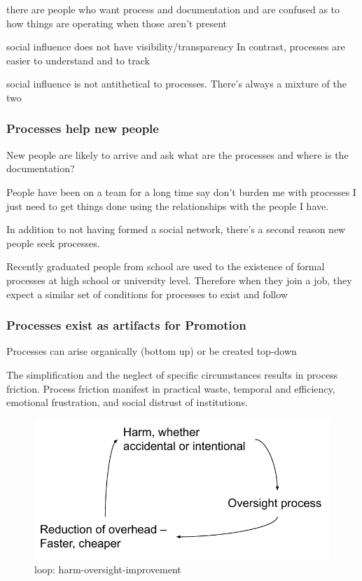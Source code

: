 there are people who want process and documentation and are confused as to how things are operating when those aren't present


social influence does not have visibility/transparency
In contrast, processes are easier to understand and to track

social influence is not antithetical to processes. There's always a mixture of the two


\subsubsection{Processes help new people}

New people are likely to arrive and ask what are the processes and where is the documentation?

People have been on a team for a long time say don't burden me with processes I just need to get things done using the relationships with the people I have.

In addition to not having formed a social network, there's a second reason new people seek processes.

Recently graduated people from school are used to the existence of formal processes at high school or university level. Therefore when they join a job, they expect a similar set of conditions for processes to exist and follow

\subsubsection{Processes exist as artifacts for Promotion}

Processes can arise organically (bottom up) or be created top-down




The simplification and the neglect of specific circumstances results in process friction. Process friction manifest in practical waste, temporal and efficiency, emotional frustration, and social distrust of institutions.




\begin{figure}
    \centering
    \includegraphics{images/process_loop_harm-oversight-improvement}
    \caption{loop: harm-oversight-improvement}
    \label{fig:harm-oversight-improvement}
\end{figure}



